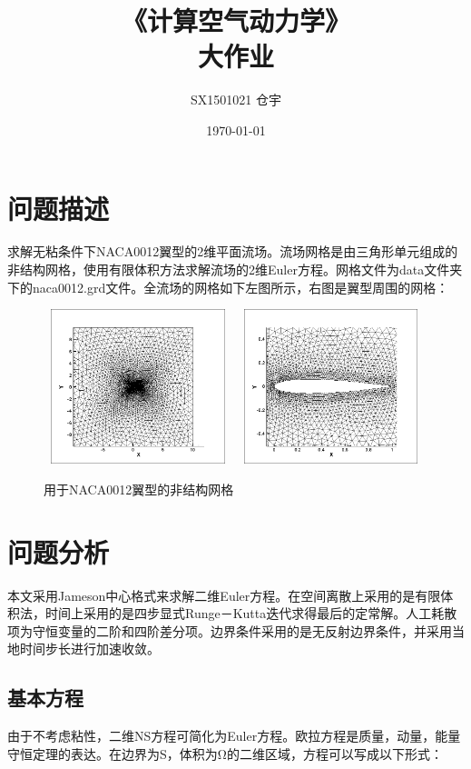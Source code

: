 \documentclass[UTF8]{ctexart}
\title{\heiti 《计算空气动力学》 \\ 大作业}
\author{SX1501021 仓宇}
\date{\today}
\begin{document}
\maketitle
\setcounter{page}{0}
\thispagestyle{empty}
\clearpage

\tableofcontents
\clearpage

\section{问题描述}
求解无粘条件下NACA0012翼型的2维平面流场。流场网格是由三角形单元组成的非结构网格，使用有限体积方法求解流场的2维Euler方程。网格文件为data文件夹下的naca0012.grd文件。全流场的网格如下左图所示，右图是翼型周围的网格：
\begin{figure}[htbp]
\centering\includegraphics[width=5.5cm,height=4.5cm]{../data/mesh_naca0012.png}
\centering\includegraphics[width=5.5cm,height=4.5cm]{../data/mesh_naca0012_local.png}
\caption{用于NACA0012翼型的非结构网格}
\end{figure}

\section{问题分析}
本文采用Jameson中心格式来求解二维Euler方程。在空间离散上采用的是有限体积法，时间上采用的是四步显式Runge－Kutta迭代求得最后的定常解。人工耗散项为守恒变量的二阶和四阶差分项。边界条件采用的是无反射边界条件，并采用当地时间步长进行加速收敛。

\subsection{基本方程}
由于不考虑粘性，二维NS方程可简化为Euler方程。欧拉方程是质量，动量，能量守恒定理的表达。在边界为S，体积为Ω的二维区域，方程可以写成以下形式：
\begin{equation}

\end{equation}
\end{document}
